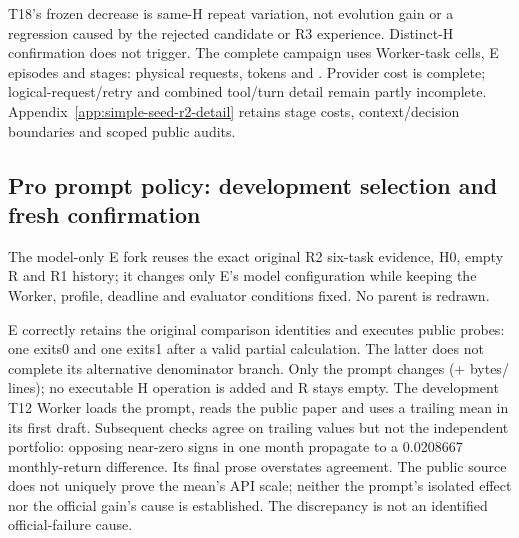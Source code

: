 T18's frozen decrease is same-H repeat variation, not evolution gain or a
regression caused by the rejected candidate or R3 experience. Distinct-H
confirmation does not trigger. The complete campaign uses
\SimpleSeedRTwoTerminalWorkerCells{} Worker-task cells,
\SimpleSeedRTwoTerminalEvolverEpisodes{} E episodes and
\SimpleSeedRTwoTerminalStages{} stages:
\SimpleSeedRTwoTerminalRequests{} physical requests,
\SimpleSeedRTwoTerminalTokens{} tokens and \SimpleSeedRTwoTerminalCost{}.
Provider cost is complete; logical-request/retry and combined tool/turn
detail remain partly incomplete. Appendix~\ref{app:simple-seed-r2-detail}
retains stage costs, context/decision boundaries and scoped public audits.

\subsection{Pro prompt policy: development selection and fresh confirmation}
\label{sec:pro-evolver-fork}

The model-only E fork reuses the exact original R2 six-task evidence, H0,
empty R and R1 history; it changes only E's model configuration while keeping
the Worker, profile, deadline and evaluator conditions fixed. No parent is redrawn.

E correctly retains the original comparison identities and executes
\ProEvolverForkPublicProbes{} public probes: one exits0 and one exits1 after
a valid partial calculation. The latter does not complete its alternative
denominator branch. Only the prompt changes
(+\ProEvolverForkPromptAddedBytes{} bytes/\ProEvolverForkPromptAddedLines{}
lines); no executable H operation is added and R stays empty.
The development T12 Worker loads the prompt, reads the public paper and uses a
trailing mean in its first draft. Subsequent checks agree on trailing values
but not the independent portfolio: opposing near-zero signs in one month
propagate to a 0.0208667 monthly-return difference. Its final prose overstates
agreement. The public source does not uniquely prove the mean's API scale;
neither the prompt's isolated effect nor the official gain's cause is established.
The discrepancy is not an identified official-failure cause.

